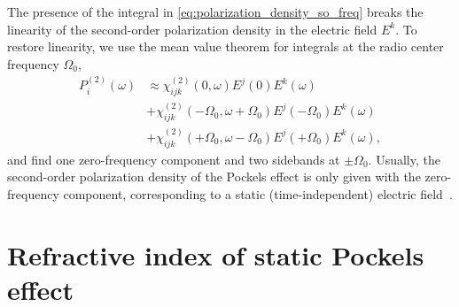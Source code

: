 The presence of the integral in \cref{eq:polarization_density_so_freq} breaks the linearity of the second-order polarization density in the electric field $E^k$.
To restore linearity, we use the mean value theorem for integrals at the radio center frequency $\Omega_0$,
\begin{equation}
	\begin{split}
		P_i^{(2)}(\omega)
		&\approx
		\chi^{(2)}_{ijk}(0,\omega)
		E^j(0)
		E^k(\omega)
		\\
		&+
		\chi^{(2)}_{ijk}(-\Omega_0,\omega+\Omega_0)
		E^j(-\Omega_0)
		E^k(\omega)
		\\
		&+
		\chi^{(2)}_{ijk}(+\Omega_0,\omega-\Omega_0)
		E^j(+\Omega_0)
		E^k(\omega)
		,
	\end{split}
\end{equation}
and find one zero-frequency component and two sidebands at $\pm\Omega_0$.
Usually, the second-order polarization density of the Pockels effect is only given with the zero-frequency component, corresponding to a static (time-independent) electric field~\cite[p.~495]{Boyd2020}.

\section{Refractive index of static Pockels effect}\label{sec:static_pockels}


